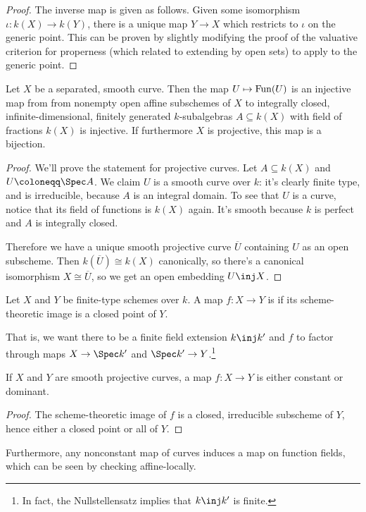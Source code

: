 \begin{proof}
The inverse map is given as follows. Given some isomorphism $\iota \colon k(X) \to k(Y)$, there is a unique map $Y \to X$ which restricts to $\iota$ on the generic point. This can be proven by slightly modifying the proof of the valuative criterion for properness (which related to extending by open sets) to apply to the generic point.
\end{proof}
\begin{prop}
Let $X$ be a separated, smooth curve. Then the map $U\mapsto\mathrm{Fun}(U)$ is an injective map from from nonempty open
affine subschemes of $X$ to integrally closed, infinite-dimensional, finitely generated $k$-subalgebras $A\subseteq
k(X)$ with field of fractions $k(X)$ is injective. If furthermore $X$ is projective, this map is a bijection.
\end{prop}
\begin{proof}
We'll prove the statement for projective curves. Let $A\subseteq k(X)$ and $U\coloneqq\Spec A$. We claim $U$ is a
smooth curve over $k$: it's clearly finite type, and is irreducible, because $A$ is an integral domain. To see that
$U$ is a curve, notice that its field of functions is $k(X)$ again. It's smooth because $k$ is perfect and $A$ is
integrally closed.

Therefore we have a unique smooth projective curve $\overline U$ containing $U$ as an open subscheme. Then
$k(\overline U)\cong k(X)$ canonically, so there's a canonical isomorphism $X\cong\overline U$, so we get an open
embedding $U\inj X$.
\end{proof}
\begin{defn}
Let $X$ and $Y$ be finite-type schemes over $k$. A map $f\colon X\to Y$ is  if its scheme-theoretic
image is a closed point of $Y$.
\end{defn}
That is, we want there to be a finite field extension $k\inj k'$ and $f$ to factor through maps $X\to\Spec k'$ and
$\Spec k'\to Y$.\footnote{In fact, the Nullstellensatz implies that $k\inj k'$ is finite.}
\begin{prop}
If $X$ and $Y$ are smooth projective curves, a map $f\colon X\to Y$ is either constant or dominant.
\end{prop}
\begin{proof}
The scheme-theoretic image of $f$ is a closed, irreducible subscheme of $Y$, hence either a closed point or all of
$Y$.
\end{proof}
Furthermore, any nonconstant map of curves induces a map on function fields, which can be seen by checking affine-locally.

